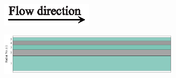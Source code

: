\documentclass[preprint,12pt]{elsarticle}
\begin{document}
\begin{figure}[h!]
     \centering
     \begin{subfigure}[b]{\textwidth}
     	\includegraphics[width=\textwidth]{flow_dir.eps}
     \end{subfigure}
     \begin{subfigure}[b]{0.85\textwidth}
\includegraphics[width=\textwidth]{results/segments/5segEq/50C50T/seg.png}
     \end{subfigure}
     \hfill
     \begin{subfigure}[b]{0.1\textwidth}

\end{subfigure}
\end{figure}
\end{document}
